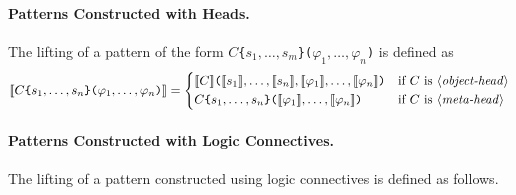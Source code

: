 \documentclass[UTF8,11pt]{article}
\theoremstyle{plain}
\theoremstyle{definition}
\theoremstyle{remark}
\newcommand{\denote}[1]{\llbracket{#1}\rrbracket}
\newcommand{\syntacc}[1]{\text{$\langle$\textit{#1}$\rangle$}}
\begin{document}
\paragraph{Patterns Constructed with Heads.}
The lifting of a pattern of the form 
\texttt{$C$\{$s_1,\dots,s_m$\}($\varphi_1,\dots,\varphi_n$)} is defined as
\begin{align*}
\denote{C\texttt{\{}s_1,\dots,s_n\texttt{\}}\texttt{(}\varphi_1,
	\dots,\varphi_n\texttt{)}}
 =
\begin{cases*}
\denote{C}\texttt{(}\denote{s_1},\dots,\denote{s_n},\denote{
	\varphi_1},\dots,\denote{\varphi_n}\texttt{)} & if $C$ is 
	\syntacc{object-head}\\
C\texttt{\{}s_1,\dots,s_n\texttt{\}}\texttt{(}\denote{
	\varphi_1},\dots,\denote{\varphi_n}\texttt{)} & if $C$ is 
	\syntacc{meta-head}
\end{cases*}
\end{align*}

\paragraph{Patterns Constructed with Logic Connectives.}
The lifting of a pattern constructed using logic connectives is defined as 
follows.
\end{document}
